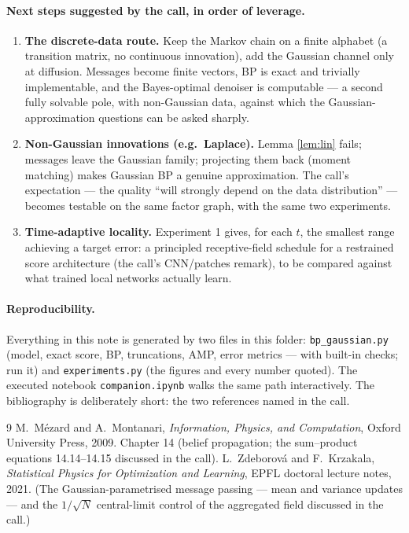 \documentclass[11pt]{article}
\theoremstyle{definition}
\theoremstyle{remark}
\begin{document}
\paragraph{Next steps suggested by the call, in order of leverage.}
\begin{enumerate}[leftmargin=1.7em, itemsep=2pt]
\item \textbf{The discrete-data route.} Keep the Markov chain on a finite
alphabet (a transition matrix, no continuous innovation), add the Gaussian
channel only at diffusion. Messages become finite vectors, BP is exact and
trivially implementable, and the Bayes-optimal denoiser is computable ---
a second fully solvable pole, with non-Gaussian data, against which the
Gaussian-approximation questions can be asked sharply.
\item \textbf{Non-Gaussian innovations (e.g.\ Laplace).} Lemma
\ref{lem:lin} fails; messages leave the Gaussian family; projecting them
back (moment matching) makes Gaussian BP a genuine approximation. The
call's expectation --- the quality ``will strongly depend on the data
distribution'' --- becomes testable on the same factor graph, with the
same two experiments.
\item \textbf{Time-adaptive locality.} Experiment 1 gives, for each $t$,
the smallest range achieving a target error: a principled receptive-field
schedule for a restrained score architecture (the call's CNN/patches
remark), to be compared against what trained local networks actually
learn.
\end{enumerate}

\paragraph{Reproducibility.} Everything in this note is generated by two
files in this folder: \texttt{bp\_gaussian.py} (model, exact score, BP,
truncations, AMP, error metrics --- with built-in checks; run it) and
\texttt{experiments.py} (the figures and every number quoted). The
executed notebook \texttt{companion.ipynb} walks the same path
interactively. The bibliography is deliberately short: the two references
named in the call.

\begin{thebibliography}{9}
 M.~M\'ezard and A.~Montanari,
\emph{Information, Physics, and Computation}, Oxford University Press,
2009. Chapter 14 (belief propagation; the sum--product equations
14.14--14.15 discussed in the call).
 L.~Zdeborov\'a and F.~Krzakala,
\emph{Statistical Physics for Optimization and Learning}, EPFL doctoral
lecture notes, 2021. (The Gaussian-parametrised message passing --- mean
and variance updates --- and the $1/\sqrt N$ central-limit control of the
aggregated field discussed in the call.)
\end{thebibliography}
\end{document}
